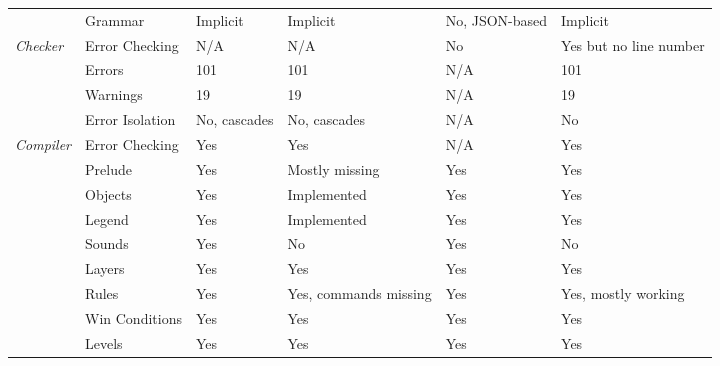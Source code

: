 \begin{figure}[!t]
\begin{tabular}{p{2cm}|p{3cm}|p{2cm}|p{2cm}|p{2cm}|p{2cm}}
                      & Grammar             & Implicit              & Implicit                     & No, JSON-based          & Implicit                      \\
    \textit{Checker}  & Error Checking      & N/A                   & N/A                          & No                      & Yes but no line number        \\
                      & Errors              & 101                   & 101                          & N/A                     & 101                           \\
                      & Warnings            & 19                    & 19                           & N/A                     & 19                            \\
                      & Error Isolation     & No, cascades          & No, cascades                 & N/A                     & No                            \\
    \textit{Compiler} & Error Checking      & Yes                   & Yes                          & N/A                     & Yes                           \\
                      & Prelude             & Yes                   & Mostly missing               & Yes                     & Yes                           \\
                      & Objects             & Yes                   & Implemented                  & Yes                     & Yes                           \\
                      & Legend              & Yes                   & Implemented                  & Yes                     & Yes                           \\
                      & Sounds              & Yes                   & No                           & Yes                     & No                            \\
                      & Layers              & Yes                   & Yes                          & Yes                     & Yes                           \\
                      & Rules               & Yes                   & Yes, commands missing   & Yes                     & Yes, mostly working           \\
                      & Win Conditions      & Yes                   & Yes                          & Yes                     & Yes                           \\
                      & Levels              & Yes                   & Yes                          & Yes                     & Yes                           \\

\end{tabular}
\end{figure}
